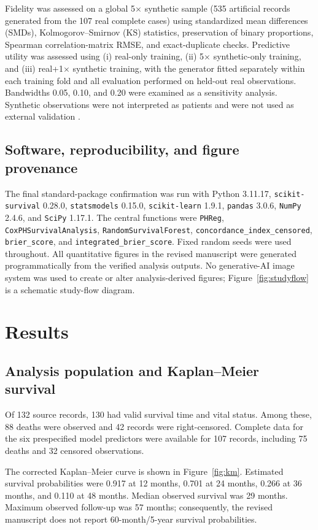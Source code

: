 \documentclass[a4paper,12pt]{article}
\begin{document}
Fidelity was assessed on a global 5$\times$ synthetic sample (535 artificial records generated from the 107 real complete cases) using standardized mean differences (SMDs), Kolmogorov--Smirnov (KS) statistics, preservation of binary proportions, Spearman correlation-matrix RMSE, and exact-duplicate checks. Predictive utility was assessed using (i) real-only training, (ii) 5$\times$ synthetic-only training, and (iii) real+1$\times$ synthetic training, with the generator fitted separately within each training fold and all evaluation performed on held-out real observations. Bandwidths 0.05, 0.10, and 0.20 were examined as a sensitivity analysis. Synthetic observations were not interpreted as patients and were not used as external validation \cite{ref40,ref41}.

\subsection{Software, reproducibility, and figure provenance}
The final standard-package confirmation was run with Python 3.11.17, \texttt{scikit-survival} 0.28.0, \texttt{statsmodels} 0.15.0, \texttt{scikit-learn} 1.9.1, \texttt{pandas} 3.0.6, \texttt{NumPy} 2.4.6, and \texttt{SciPy} 1.17.1. The central functions were \texttt{PHReg}, \texttt{CoxPHSurvivalAnalysis}, \texttt{RandomSurvivalForest}, \texttt{concordance\_index\_censored}, \texttt{brier\_score}, and \texttt{integrated\_brier\_score}. Fixed random seeds were used throughout. All quantitative figures in the revised manuscript were generated programmatically from the verified analysis outputs. No generative-AI image system was used to create or alter analysis-derived figures; Figure~\ref{fig:studyflow} is a schematic study-flow diagram.

\section{Results}
\subsection{Analysis population and Kaplan--Meier survival}
Of 132 source records, 130 had valid survival time and vital status. Among these, 88 deaths were observed and 42 records were right-censored. Complete data for the six prespecified model predictors were available for 107 records, including 75 deaths and 32 censored observations.

The corrected Kaplan--Meier curve is shown in Figure~\ref{fig:km}. Estimated survival probabilities were 0.917 at 12 months, 0.701 at 24 months, 0.266 at 36 months, and 0.110 at 48 months. Median observed survival was 29 months. Maximum observed follow-up was 57 months; consequently, the revised manuscript does not report 60-month/5-year survival probabilities.
\end{document}

